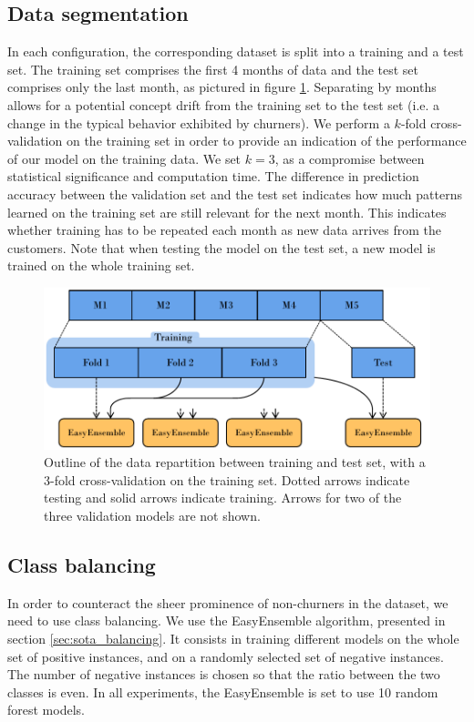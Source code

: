 \subsection{Data segmentation}
\label{sec:churn_data_seg}

In each configuration, the corresponding dataset is split into a training and a
test set. The training set comprises the first 4 months of data and the test set
comprises only the last month, as pictured in figure
\ref{fig:experiment_diagram}. Separating by months allows for a potential
concept drift from the training set to the test set (i.e. a change in the
typical behavior exhibited by churners). We perform a $k$-fold cross-validation
on the training set in order to provide an indication of the performance of our
model on the training data. We set $k=3$, as a compromise between statistical
significance and computation time. The difference in prediction accuracy between
the validation set and the test set indicates how much patterns learned on the
training set are still relevant for the next month. This indicates whether
training has to be repeated each month as new data arrives from the customers.
Note that when testing the model on the test set, a new model is trained on the
whole training set.

\begin{figure}
    \centering
	\includegraphics[width=0.9\linewidth]{figures/experiment_diagram.pdf}
	\caption{Outline of the data repartition between training and test set, with
	a 3-fold cross-validation on the training set. Dotted arrows indicate
	testing and solid arrows indicate training. Arrows for two of the three
	validation models are not shown.}
	\label{fig:experiment_diagram}
\end{figure}

\subsection{Class balancing}

In order to counteract the sheer prominence of non-churners in the dataset, we
need to use class balancing. We use the EasyEnsemble algorithm, presented in
section \ref{sec:sota_balancing}. It consists in training different models on
the whole set of positive instances, and on a randomly selected set of negative
instances. The number of negative instances is chosen so that the ratio between
the two classes is even. In all experiments, the EasyEnsemble is set to use 10
random forest models.

